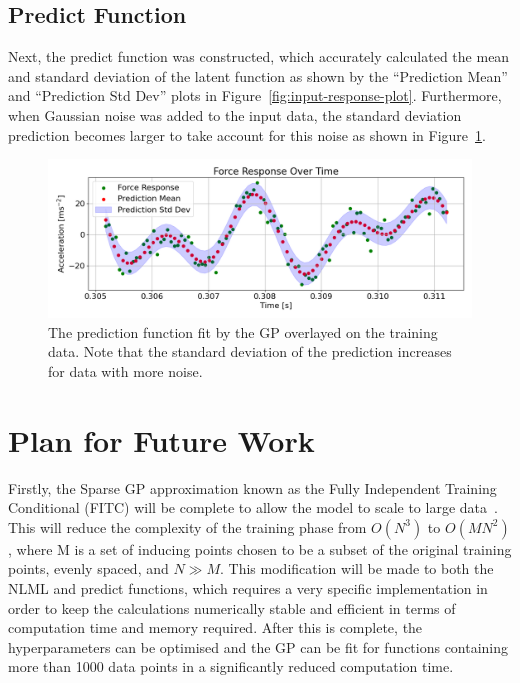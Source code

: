 \documentclass[12pt]{article}
\begin{document}
    \subsection{Predict Function}
    Next, the predict function was constructed, which accurately calculated the mean and standard deviation of the latent function as shown by the ``Prediction Mean'' and ``Prediction Std Dev'' plots in Figure~\ref{fig:input-response-plot}.
    Furthermore, when Gaussian noise was added to the input data, the standard deviation prediction becomes larger to take account for this noise as shown in Figure~\ref{fig:input-response-noise}.


    \begin{figure}[ht]
        \centering
        \includegraphics[width=1.0\linewidth]{figures/input-response-noise/input-response-noise.png}
        \caption{The prediction function fit by the GP overlayed on the training data. Note that the standard deviation of the prediction increases for data with more noise.}
        \label{fig:input-response-noise}
    \end{figure}

    \section{Plan for Future Work}
    Firstly, the Sparse GP approximation known as the Fully Independent Training Conditional (FITC) will be complete to allow the model to scale to large data~\cite{q-candela}.
    This will reduce the complexity of the training phase from $O(N^3)$ to $O(MN^2)$, where M is a set of inducing points chosen to be a subset of the original training points, evenly spaced, and $N \gg M$.  
    This modification will be made to both the NLML and predict functions, which requires a very specific implementation in order to keep the calculations numerically stable and efficient in terms of computation time and memory required.
    After this is complete, the hyperparameters can be optimised and the GP can be fit for functions containing more than 1000 data points in a significantly reduced computation time.
\end{document}
